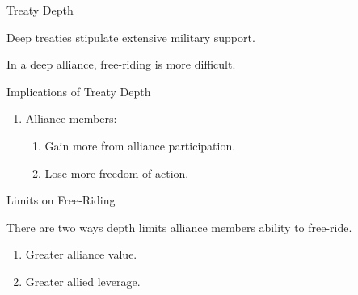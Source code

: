 \documentclass[12pt]{beamer}
\begin{document}

\begin{frame}{Treaty Depth}

Deep treaties stipulate extensive military support. 


\end{frame}


\begin{frame}[standout]

In a deep alliance, free-riding is more difficult.   

\end{frame}



\begin{frame}{Implications of Treaty Depth}

\begin{enumerate}
\item Alliance members: 
\begin{enumerate} 
\pause
\item Gain more from alliance participation. 
\pause
\item Lose more freedom of action. 
\end{enumerate}  

\end{enumerate}

\end{frame}


\begin{frame}{Limits on Free-Riding}

There are two ways depth limits alliance members ability to free-ride. 

\begin{enumerate}
\item Greater alliance value.  
\pause
\item Greater allied leverage. 
\end{enumerate}

\end{frame}
\end{document}
